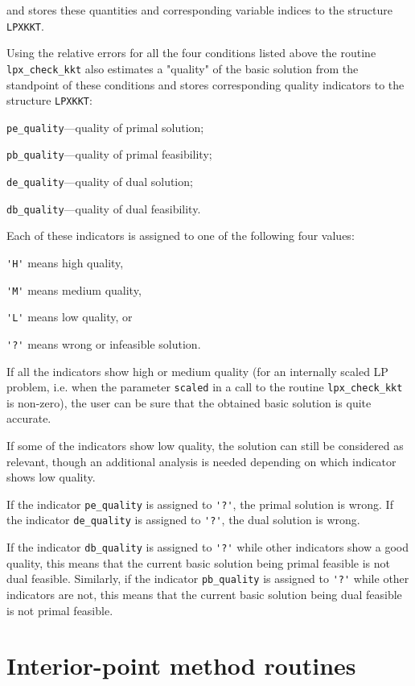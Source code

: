 \noindent
and stores these quantities and corresponding variable indices to the
structure \verb|LPXKKT|.

Using the relative errors for all the four conditions listed above the
routine
\verb|lpx_check_kkt| also estimates a "quality" of the basic solution
from the standpoint of these conditions and stores corresponding
quality indicators to the structure \verb|LPXKKT|:

\verb|pe_quality|---quality of primal solution;

\verb|pb_quality|---quality of primal feasibility;

\verb|de_quality|---quality of dual solution;

\verb|db_quality|---quality of dual feasibility.

Each of these indicators is assigned to one of the following four
values:

\verb|'H'| means high quality,

\verb|'M'| means medium quality,

\verb|'L'| means low quality, or

\verb|'?'| means wrong or infeasible solution.

If all the indicators show high or medium quality (for an internally
scaled LP problem, i.e. when the parameter \verb|scaled| in a call to
the routine \verb|lpx_check_kkt| is non-zero), the user can be sure that
the obtained basic solution is quite accurate.

If some of the indicators show low quality, the solution can still be
considered as relevant, though an additional analysis is needed
depending on which indicator shows low quality.

If the indicator \verb|pe_quality| is assigned to \verb|'?'|, the
primal solution is wrong. If the indicator \verb|de_quality| is assigned
to \verb|'?'|, the dual solution is wrong.

If the indicator \verb|db_quality| is assigned to \verb|'?'| while
other indicators show a good quality, this means that the current
basic solution being primal feasible is not dual feasible. Similarly,
if the indicator \verb|pb_quality| is assigned to \verb|'?'| while
other indicators are not, this means that the current basic solution
being dual feasible is not primal feasible.


\newpage

\section{Interior-point method routines}

